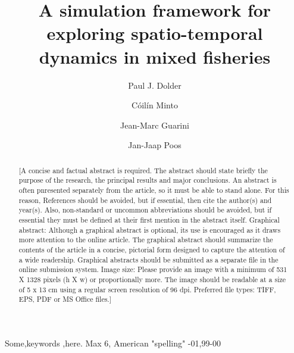 \documentclass[review]{elsarticle}
\begin{document}
\begin{frontmatter}

\title{A simulation framework for exploring spatio-temporal dynamics in mixed
	fisheries}

\author[1,2]{Paul J. Dolder}

\author[1]{Cóilín Minto}
\author[3]{Jean-Marc Guarini}
\author[4]{Jan-Jaap Poos}

\address[1]{Galway-Mayo Institute of Technology (GMIT), Dublin Road, Galway,
	Ireland} 
\address[2]{Centre for Environment, Fisheries and Aquaculture Science (Cefas),
	Pakefield Road, Lowestoft, UK}
\address[3]{Université Pierre et Marie Curie, 4 Place Jussieu, 75005 Paris,
	France}
\address[4]{Wageningen Marine Research, Haringkade 1 1976 CP IJmuiden,
	Netherlands}

\begin{abstract}
[A concise and factual abstract is required. The abstract should state briefly
the purpose of the research, the principal results and major conclusions. An
abstract is often pnresented separately from the article, so it must be able to
stand alone. For this reason, References should be avoided, but if essential,
then cite the author(s) and year(s). Also, non-standard or uncommon
abbreviations should be avoided, but if essential they must be defined at their
first mention in the abstract itself.  
Graphical abstract: Although a graphical abstract is optional, its use is
encouraged as it draws more attention to the online article. The graphical
abstract should summarize the contents of the article in a concise, pictorial
form designed to capture the attention of a wide readership. Graphical
abstracts should be submitted as a separate file in the online submission
system. Image size: Please provide an image with a minimum of 531 X 1328 pixels
(h X w) or proportionally more. The image should be readable at a size of 5 x
13 cm using a regular screen resolution of 96 dpi.  Preferred file types: TIFF,
EPS, PDF or MS Office files.]
\end{abstract}

\begin{keyword}
Some\sep keywords \sep here. Max 6, American "spelling" 
-01\sep  99-00
\end{keyword}

\end{frontmatter}

\linenumbers
\end{document}
